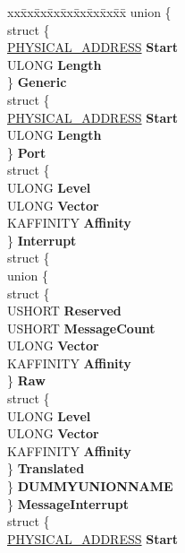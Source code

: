 \begin{DoxyCompactItemize}
\begin{tabbing}
\end{tabbing}\item 
\mbox{\label{struct___c_m___p_a_r_t_i_a_l___r_e_s_o_u_r_c_e___d_e_s_c_r_i_p_t_o_r_a846ff131fd02e66d29e0d9f028351b33}} 
\begin{tabbing}
xx\=xx\=xx\=xx\=xx\=xx\=xx\=xx\=xx\=\kill
union \{\\
\>struct \{\\
\>\>\hyperlink{union___l_a_r_g_e___i_n_t_e_g_e_r}{PHYSICAL\_ADDRESS} {\bfseries Start}\\
\>\>ULONG {\bfseries Length}\\
\>\} {\bfseries Generic}\\
\>struct \{\\
\>\>\hyperlink{union___l_a_r_g_e___i_n_t_e_g_e_r}{PHYSICAL\_ADDRESS} {\bfseries Start}\\
\>\>ULONG {\bfseries Length}\\
\>\} {\bfseries Port}\\
\>struct \{\\
\>\>ULONG {\bfseries Level}\\
\>\>ULONG {\bfseries Vector}\\
\>\>KAFFINITY {\bfseries Affinity}\\
\>\} {\bfseries Interrupt}\\
\>struct \{\\
\>\>union \{\\
\>\>\>struct \{\\
\>\>\>\>USHORT {\bfseries Reserved}\\
\>\>\>\>USHORT {\bfseries MessageCount}\\
\>\>\>\>ULONG {\bfseries Vector}\\
\>\>\>\>KAFFINITY {\bfseries Affinity}\\
\>\>\>\} {\bfseries Raw}\\
\>\>\>struct \{\\
\>\>\>\>ULONG {\bfseries Level}\\
\>\>\>\>ULONG {\bfseries Vector}\\
\>\>\>\>KAFFINITY {\bfseries Affinity}\\
\>\>\>\} {\bfseries Translated}\\
\>\>\} {\bfseries DUMMYUNIONNAME}\\
\>\} {\bfseries MessageInterrupt}\\
\>struct \{\\
\>\>\hyperlink{union___l_a_r_g_e___i_n_t_e_g_e_r}{PHYSICAL\_ADDRESS} {\bfseries Start}\\

\end{tabbing}
\end{DoxyCompactItemize}
